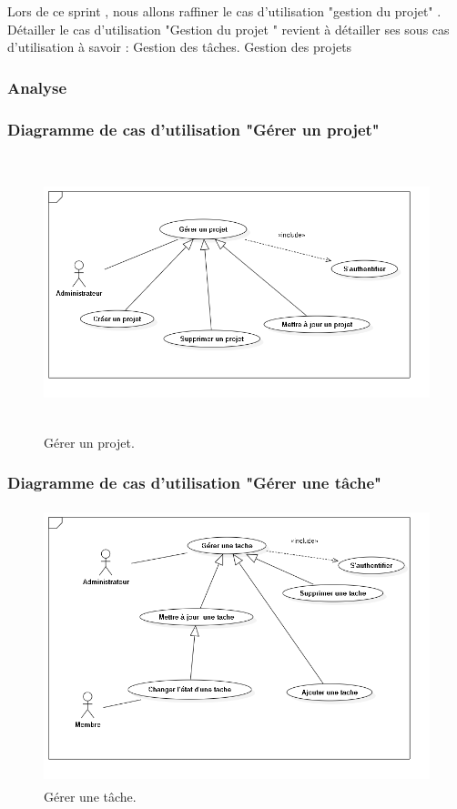 Lors de ce sprint , nous allons raffiner le cas d’utilisation "gestion du projet" .
D\'{e}tailler le cas d'utilisation \guillemotleft{} "Gestion du projet " \guillemotright{} revient \`{a} d\'{e}tailler
ses sous cas d'utilisation \`{a} savoir :
\textbullet{} Gestion des t\^{a}ches.
\textbullet{} Gestion des projets
\subsubsection{Analyse}

\subsubsection{ Diagramme de cas d'utilisation "G\'{e}rer un projet"}

\begin{figure}[H]
\center
\includegraphics[width=13cm,height=8cm]{./figures/ucP.png}
\caption{G\'{e}rer un projet.}

\end{figure}

\subsubsection{ Diagramme de cas d'utilisation "G\'{e}rer une t\^{a}che"}
\begin{figure}[H]
\center
\includegraphics[width=13cm,height=8cm]{./figures/ucT.png}
\caption{G\'{e}rer une t\^{a}che.}

\end{figure}



